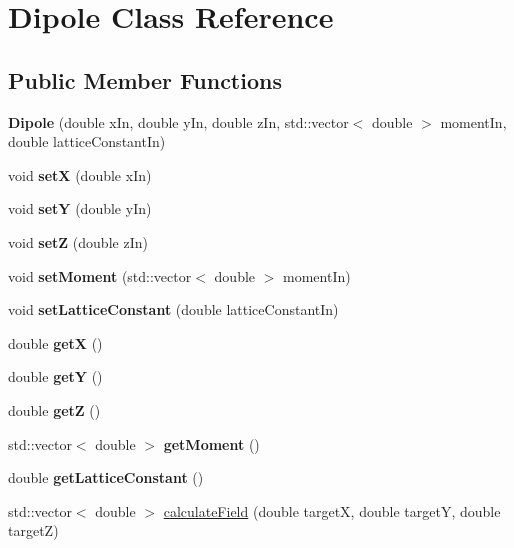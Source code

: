 \hypertarget{class_dipole}{}\section{Dipole Class Reference}
\label{class_dipole}
\subsection*{Public Member Functions}
\begin{DoxyCompactItemize}
\item 
\mbox{\label{class_dipole_a84a9daae2bdc84641ad90e0bcfb71e84}} 
{\bfseries Dipole} (double x\+In, double y\+In, double z\+In, std\+::vector$<$ double $>$ moment\+In, double lattice\+Constant\+In)
\item 
\mbox{\label{class_dipole_aaa7ffe92c7d2499a485e75c8c77272b8}} 
void {\bfseries setX} (double x\+In)
\item 
\mbox{\label{class_dipole_a743ebc256e831f6b2bebde453a2c6e18}} 
void {\bfseries setY} (double y\+In)
\item 
\mbox{\label{class_dipole_a8162082170fb5d541534d330a56c68ee}} 
void {\bfseries setZ} (double z\+In)
\item 
\mbox{\label{class_dipole_ad1e29d380b5be78abe1941ffec3bd51d}} 
void {\bfseries set\+Moment} (std\+::vector$<$ double $>$ moment\+In)
\item 
\mbox{\label{class_dipole_ae0325dcbd0156dd22b2d45dafb29eb47}} 
void {\bfseries set\+Lattice\+Constant} (double lattice\+Constant\+In)
\item 
\mbox{\label{class_dipole_af74377e645f1ab53b5f5c943f627d617}} 
double {\bfseries getX} ()
\item 
\mbox{\label{class_dipole_a888e62c6df4cbcbee9ceede2d559fb92}} 
double {\bfseries getY} ()
\item 
\mbox{\label{class_dipole_abac4c549351bbf1caf9cca98862edb7e}} 
double {\bfseries getZ} ()
\item 
\mbox{\label{class_dipole_a55d4136b363783c400d870dba2c90d0d}} 
std\+::vector$<$ double $>$ {\bfseries get\+Moment} ()
\item 
\mbox{\label{class_dipole_a2098715d78572a3b1718159be726537f}} 
double {\bfseries get\+Lattice\+Constant} ()
\item 
std\+::vector$<$ double $>$ \mbox{\hyperlink{class_dipole_a5027f01fb1bd8c04bfb635badee6be61}{calculate\+Field}} (double targetX, double targetY, double targetZ)
\end{DoxyCompactItemize}


